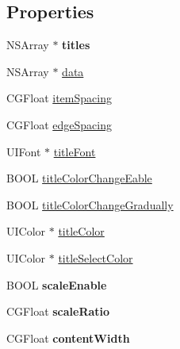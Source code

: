 \subsection*{Properties}
\begin{DoxyCompactItemize}
\item 
\mbox{\label{interface_x_w_catergory_view_property_a33b8c997417173542cd1f1ad8cafd2fc}} 
N\+S\+Array $\ast$ {\bfseries titles}
\item 
N\+S\+Array $\ast$ \mbox{\hyperlink{interface_x_w_catergory_view_property_ac0d73797ff8c058cf918e7675a50c739}{data}}
\item 
C\+G\+Float \mbox{\hyperlink{interface_x_w_catergory_view_property_a0c4f4fbcb2d068140d561ad5bcbb737e}{item\+Spacing}}
\item 
C\+G\+Float \mbox{\hyperlink{interface_x_w_catergory_view_property_a4c533c0a5e7d37c73d1fe7142398a781}{edge\+Spacing}}
\item 
U\+I\+Font $\ast$ \mbox{\hyperlink{interface_x_w_catergory_view_property_a6be5678540b90854eaa566139ae4260b}{title\+Font}}
\item 
B\+O\+OL \mbox{\hyperlink{interface_x_w_catergory_view_property_af34ac7a6fa77dbc8ee32ac83e31565ce}{title\+Color\+Change\+Eable}}
\item 
B\+O\+OL \mbox{\hyperlink{interface_x_w_catergory_view_property_a72ec443c04d73456323e2afdce03b366}{title\+Color\+Change\+Gradually}}
\item 
U\+I\+Color $\ast$ \mbox{\hyperlink{interface_x_w_catergory_view_property_ab087832c26f26ed055b9ea8d8497fb07}{title\+Color}}
\item 
U\+I\+Color $\ast$ \mbox{\hyperlink{interface_x_w_catergory_view_property_ab26d440c8e9f91d3e7e3ff0141b2ad9a}{title\+Select\+Color}}
\item 
\mbox{\label{interface_x_w_catergory_view_property_a861934bb01f8d464175efe5e18edcc3d}} 
B\+O\+OL {\bfseries scale\+Enable}
\item 
\mbox{\label{interface_x_w_catergory_view_property_aa04b4b8434e43b7e4cd5d848fc070861}} 
C\+G\+Float {\bfseries scale\+Ratio}
\item 
\mbox{\label{interface_x_w_catergory_view_property_abce5fc387a36c231f9fe9eb380a17303}} 
C\+G\+Float {\bfseries content\+Width}
\end{DoxyCompactItemize}


